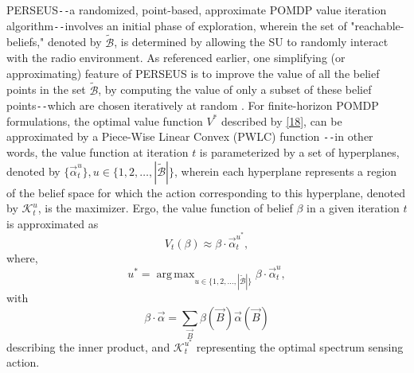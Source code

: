 \documentclass[12pt, draftcls, onecolumn]{IEEEtran}
\DeclareMathOperator*{\argmax}{arg\,max}
\begin{document}
PERSEUS\texttt{-{}-}a randomized, point-based, approximate POMDP value iteration algorithm\texttt{-{}-}involves an initial phase of exploration, wherein the set of "reachable-beliefs," denoted by $\tilde{\mathcal{B}}$, is determined by allowing the SU to randomly interact with the radio environment. As referenced earlier, one simplifying (or approximating) feature of PERSEUS is to improve the value of all the belief points in the set $\tilde{\mathcal{B}}$, by computing the value of only a subset of these belief points\texttt{-{}-}which are chosen iteratively at random . For finite-horizon POMDP formulations, the optimal value function $V^{*}$ described by \eqref{18}, can be approximated by a Piece-Wise Linear Convex (PWLC) function \cite{WCL:13}\texttt{-{}-}in other words, the value function at iteration $t$ is parameterized by a set of hyperplanes, denoted by $\{\vec{\alpha}_{t}^{u}\},u{\in}\{1,2,\dots,|\tilde{\mathcal{B}}|\}$, wherein each hyperplane represents a region of the belief space for which the action corresponding to this hyperplane, denoted by $\mathcal{K}_{t}^{u}$, is the maximizer. Ergo, the value function of belief $\beta$ in a given iteration $t$ is approximated as
\begin{equation}\label{22}
    V_{t}(\beta) \approx \beta \cdot \vec{\alpha}_{t}^{u^{*}},
\end{equation}
where,
\begin{equation}\label{23}
    u^{*}=\argmax_{u \in \{1,2,\dots,|\tilde{\mathcal{B}}|\}}\beta \cdot \vec{\alpha}_{t}^{u},
\end{equation}
with
\begin{equation}\label{24}
    \beta \cdot \vec{\alpha}=\sum_{\vec{B}}\beta(\vec{B})\vec{\alpha}(\vec{B})
\end{equation}
describing the inner product, and $\mathcal{K}_{t}^{u^{*}}$ representing the optimal spectrum sensing action.
\end{document}
